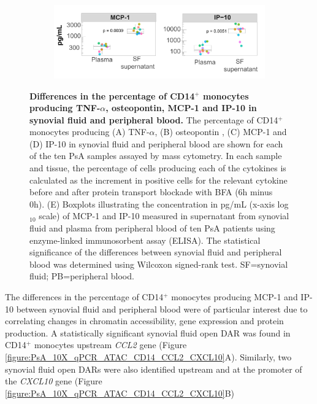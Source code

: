 \begin{figure}[H]
\begin{subfigure}[b]{0.65\textwidth}
\includegraphics[width=\textwidth]{./Results3/pdfs/ELISA_MCP1_IP10_boxplot_10_PsA_SF_plasma}
\caption{}
\end{subfigure}
\caption[Differences in the percentage of CD14$^+$ monocytes producing TNF-$\alpha$, osteopontin, MCP-1 and IP-10 in synovial fluid and peripheral blood.]{\textbf{Differences in the percentage of CD14$^+$ monocytes producing TNF-$\alpha$, osteopontin, MCP-1 and IP-10 in synovial fluid and peripheral blood.} The percentage of CD14$^+$ monocytes producing (A) TNF-$\alpha$, (B) osteopontin , (C) MCP-1 and (D) IP-10 in synovial fluid and peripheral blood are shown for each of the ten PsA samples assayed by mass cytometry. In each sample and tissue, the percentage of cells producing each of the cytokines is calculated as the increment in positive cells for the relevant cytokine before and after protein transport blockade with BFA (6h minus 0h). (E) Boxplots illustrating the concentration in pg/mL (x-axis log$_{10}$ scale) of MCP-1 and IP-10 measured in supernatant from synovial fluid and plasma from peripheral blood of ten PsA patients using enzyme-linked immunosorbent assay (ELISA). The statistical significance of the differences between synovial fluid and peripheral blood was determined using Wilcoxon signed-rank test. SF=synovial fluid; PB=peripheral blood.}
\label{figure:CyTOF_cytokines_validation_cohort}
\end{figure}





The differences in the percentage of CD14$^+$ monocytes producing MCP-1 and IP-10 between synovial fluid and peripheral blood were of particular interest due to correlating changes in chromatin accessibility, gene expression and protein production. A statistically significant synovial fluid open DAR was found in CD14$^+$ monocytes upstream \textit{CCL2} gene (Figure \ref{figure:PsA_10X_qPCR_ATAC_CD14_CCL2_CXCL10}A). Similarly, two synovial fluid open DARs were also identified upstream and at the promoter of the \textit{CXCL10} gene (Figure \ref{figure:PsA_10X_qPCR_ATAC_CD14_CCL2_CXCL10}B)


